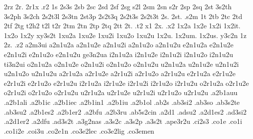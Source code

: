 {     2rz   2r.   2r1x  .r2
1s   2s3s  2sb   2sc   2sd  2sf  2sg  s2l  2sm  2sn  s2r  2sp  2sq  
     2st   3s2th 3s2ph 3s2ch
     2s2t3l      2s3tn 2st3p     2s2t3q    2s2t3s    2s2t3t  
     2s.  2st.  .s2m  
1t   2tb  2tc   2td   2tf  2tg  t2h2  t2l  t2r  2tm  2tn  2tp  2tq  2tt
     2t. .t2
x1   2x. .x2 
1x2a  1x2e  1x2i  1x2it. 1x2o 1x2y  
xy3s2t %
1xu2a 1xu2e 1xu2i 1xu2o 1xu2u 1x2u. 1x2um.  1x2us.
%
y3c2n
1z   2z. .z2
%
%
a2m3ui
%
a2n1u2a a2n1u2e a2n1u2i a2n1u2o a2n1u2u
e2n1u2a e2n1u2e e2n1u2i e2n1u2o e2n1u2u ge3n2ua
i2n1u2a i2n1u2e i2n1u2i i2n1u2o i2n1u2u ti3n2ui
o2n1u2a o2n1u2e o2n1u2i o2n1u2o o2n1u2u
u2n1u2a u2n1u2e u2n1u2i u2n1u2o u2n1u2u
%
a2r1u2a a2r1u2e a2r1u2i a2r1u2o a2r1u2u
e2r1u2a e2r1u2e e2r1u2i e2r1u2o e2r1u2u
i2r1u2a i2r1u2e i2r1u2i i2r1u2o i2r1u2u
o2r1u2a o2r1u2e o2r1u2i o2r1u2o o2r1u2u
u2r1u2a u2r1u2e u2r1u2i u2r1u2o u2r1u2u
%
.a2b1auu                           %
.a2b1ali                           %
.a2b1ic .a2b1iec .a2b1in1            %
.a2b1iu                            %
.a2b1ol                            %
.ab2s
.ab3si2                           %
.ab3so                            %
.ab3s2te                          %
.ab3su2 .a2b1es2  .a2b1er2        %
.a2bfu                            %
.a2b3ru                           %
.ab5s2cin                         %
.a2d1
.adsu2 .a2d1es2 .ad3si2 .a2d1er2  %
.a2dfu                            %
.ad3s2t                           %
.a3g2nas                          %
.a3s2c                            %
.a3s2p                            %
.a3s2t                            %
.ape3r2u                          %
.ci2s3                            %
.co1e .co1i .co1i2e .coi3u %
.co2e1n                           %
.co3e2lec .co3e2lig               %
.co3emen                          %
}
